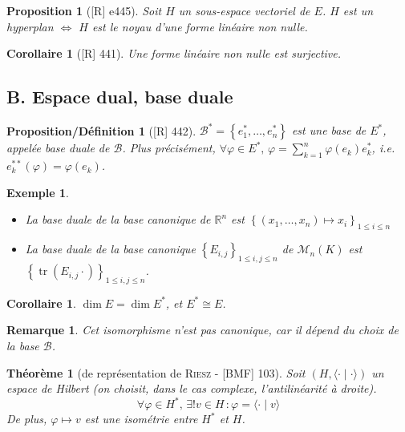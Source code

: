 \documentclass[10pt, a4paper, parskip=full, twoside, twocolumn]{report}
\newtheorem{theorem}[definition]{Théorème}
\newtheorem{proposition}[definition]{Proposition}
\newtheorem{proposition_def}[definition]{Proposition/Définition}
\newtheorem{corollary}[definition]{Corollaire}
\newtheorem{example}[definition]{Exemple}
\newtheorem{remark}[definition]{Remarque}
\newcommand{\IR}{\mathbb{R}}
\newcommand{\M}{\mathcal{M}}
\newcommand{\B}{\mathcal{B}}
\DeclareMathOperator{\tr}{tr}
\begin{document}
\begin{proposition}[\textnormal{[R] e445}]
	Soit $H$ un sous-espace vectoriel de $E$. 
	$H$ est un hyperplan $\iff$ $H$ est le noyau d'une forme linéaire non nulle.
\end{proposition}

\begin{corollary}[\textnormal{[R] 441}]
	Une forme linéaire non nulle est surjective.
\end{corollary}

\subsection*{B. Espace dual, base duale}
\begin{proposition_def}[\textnormal{[R] 442}]
	$\B^* = \left\{e_1^*,\dots, e_n^*\right\}$ est une base de $E^*$, appelée \emph{base duale de $\B$}.
	Plus précisément, $\forall \varphi\in E^*,\, \varphi = \sum_{k=1}^{n}\varphi(e_k)e_k^*$,
	\emph{i.e.} $e_k^{**}(\varphi) = \varphi(e_k)$.
\end{proposition_def}

\begin{example}
	\begin{itemize}
		\item La base duale de la base canonique de $\IR^n$ est $\left\{(x_1,\dots,x_n)\mapsto x_i\right\}_{1\leq i\leq n}$
		\item La base duale de la base canonique $\left\{E_{i,j}\right\}_{1\leq i,j\leq n}$ de $\M_n(K)$ est $\left\{\tr(E_{i,j}\cdot)\right\}_{1\leq i,j\leq n}$.
	\end{itemize}
\end{example}

\begin{corollary}
	$\dim E = \dim E^*$, et $E^*\cong E$.
\end{corollary}

\begin{remark}
	Cet isomorphisme n'est pas canonique, car il dépend du choix de la base $\B$.
\end{remark}

\begin{theorem}[de représentation de \textsc{Riesz} - \textnormal{[BMF] 103}]
	Soit $(H,\langle \cdot \mid\cdot\rangle)$ un espace de Hilbert (on choisit, dans le cas complexe, l'antilinéarité à droite).
	$$\forall \varphi\in H^*,\,\exists ! v\in H\,\colon \varphi = \langle\cdot\mid v\rangle$$
	De plus, $\varphi\mapsto v$ est une isométrie entre $H^*$ et $H$.
\end{theorem}
\end{document}
